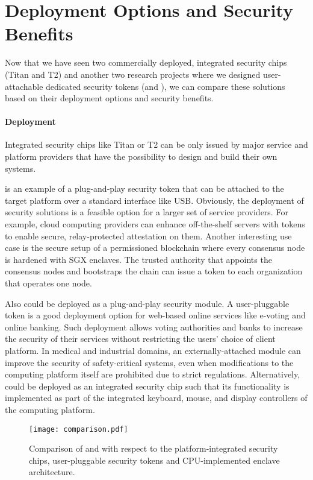 
\section*{Deployment Options and Security Benefits}

Now that we have seen two commercially deployed, integrated security chips (Titan and T2) and another two research projects where we designed user-attachable dedicated security tokens (\protection and \proximitee), we can compare these solutions based on their deployment options and security benefits. 

\paragraph{Deployment}
Integrated security chips like Titan or T2 can be only issued by major service and platform providers that have the possibility to design and build their own systems. 

\proximitee is an example of a plug-and-play security token that can be attached to the target platform over a standard interface like USB. Obviously, the deployment of security solutions is a feasible option for a larger set of service providers. For example, cloud computing providers can enhance off-the-shelf servers with \proximitee tokens to enable secure, relay-protected attestation on them. Another interesting use case is the secure setup of a permissioned blockchain where every consensus node is hardened with SGX enclaves. The trusted authority that appoints the consensus nodes and bootstraps the chain can issue a \key token to each organization that operates one node.

Also \protection could be deployed as a plug-and-play security module. A user-pluggable token is a good deployment option for web-based online services like e-voting and online banking. Such deployment allows voting authorities and banks to increase the security of their services without restricting the users’ choice of client platform. In medical and industrial domains, an externally-attached \protection module can improve the security of safety-critical systems, even when modifications to the computing platform itself are prohibited due to strict regulations. Alternatively, \protection could be deployed as an integrated security chip such that its functionality is implemented as part of the integrated keyboard, mouse, and display controllers of the computing platform. 

\begin{figure}[t]
    \centering
    \texttt{[image: comparison.pdf]}
    \caption{Comparison of \protection and \proximitee with respect to the platform-integrated security chips, user-pluggable security tokens and CPU-implemented enclave architecture.}
\label{fig:prototype}   
\end{figure}



